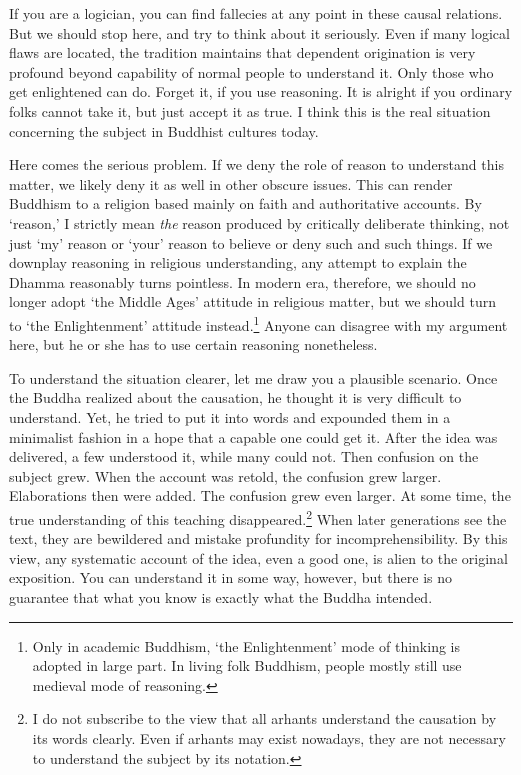 If you are a logician, you can find fallecies at any point in these causal relations. But we should stop here, and try to think about it seriously. Even if many logical flaws are located, the tradition maintains that dependent origination is very profound beyond capability of normal people to understand it. Only those who get enlightened can do. Forget it, if you use reasoning. It is alright if you ordinary folks cannot take it, but just accept it as true. I think this is the real situation concerning the subject in Buddhist cultures today.

Here comes the serious problem. If we deny the role of reason to understand this matter, we likely deny it as well in other obscure issues. This can render Buddhism to a religion based mainly on faith and authoritative accounts. By `reason,' I strictly mean \emph{the} reason produced by critically deliberate thinking, not just `my' reason or `your' reason to believe or deny such and such things. If we downplay reasoning in religious understanding, any attempt to explain the Dhamma reasonably turns pointless. In modern era, therefore, we should no longer adopt `the Middle Ages' attitude in religious matter, but we should turn to `the Enlightenment' attitude instead.\footnote{Only in academic Buddhism, `the Enlightenment' mode of thinking is adopted in large part. In living folk Buddhism, people mostly still use medieval mode of reasoning.} Anyone can disagree with my argument here, but he or she has to use certain reasoning nonetheless.

To understand the situation clearer, let me draw you a plausible scenario. Once the Buddha realized about the causation, he thought it is very difficult to understand. Yet, he tried to put it into words and expounded them in a minimalist fashion in a hope that a capable one could get it. After the idea was delivered, a few understood it, while many could not. Then confusion on the subject grew. When the account was retold, the confusion grew larger. Elaborations then were added. The confusion grew even larger. At some time, the true understanding of this teaching disappeared.\footnote{I do not subscribe to the view that all arhants understand the causation by its words clearly. Even if arhants may exist nowadays, they are not necessary to understand the subject by its notation.} When later generations see the text, they are bewildered and mistake profundity for incomprehensibility. By this view, any systematic account of the idea, even a good one, is alien to the original exposition. You can understand it in some way, however, but there is no guarantee that what you know is exactly what the Buddha intended.

